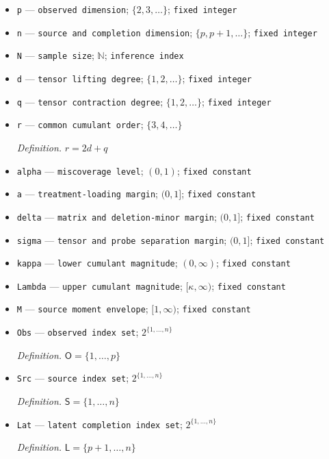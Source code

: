 \documentclass{article}
\begin{document}
\begin{itemize}
  \item \texttt{p} --- \texttt{observed dimension}; \(\{2,3,\ldots\}\); \texttt{fixed integer}
  \item \texttt{n} --- \texttt{source and completion dimension}; \(\{p,p+1,\ldots\}\); \texttt{fixed integer}
  \item \texttt{N} --- \texttt{sample size}; \(\mathbb N\); \texttt{inference index}
  \item \texttt{d} --- \texttt{tensor lifting degree}; \(\{1,2,\ldots\}\); \texttt{fixed integer}
  \item \texttt{q} --- \texttt{tensor contraction degree}; \(\{1,2,\ldots\}\); \texttt{fixed integer}
  \item \texttt{r} --- \texttt{common cumulant order}; \(\{3,4,\ldots\}\)
  \par\smallskip\noindent\emph{Definition.} \(r=2d+q\)
  \item \texttt{alpha} --- \texttt{miscoverage level}; \((0,1)\); \texttt{fixed constant}
  \item \texttt{a} --- \texttt{treatment-\allowbreak{}loading margin}; \((0,1]\); \texttt{fixed constant}
  \item \texttt{delta} --- \texttt{matrix and deletion-\allowbreak{}minor margin}; \((0,1]\); \texttt{fixed constant}
  \item \texttt{sigma} --- \texttt{tensor and probe separation margin}; \((0,1]\); \texttt{fixed constant}
  \item \texttt{kappa} --- \texttt{lower cumulant magnitude}; \((0,\infty)\); \texttt{fixed constant}
  \item \texttt{Lambda} --- \texttt{upper cumulant magnitude}; \([\kappa,\infty)\); \texttt{fixed constant}
  \item \texttt{M} --- \texttt{source moment envelope}; \([1,\infty)\); \texttt{fixed constant}
  \item \texttt{Obs} --- \texttt{observed index set}; \(2^{\{1,\ldots,n\}}\)
  \par\smallskip\noindent\emph{Definition.} \(\mathsf O=\{1,\ldots,p\}\)
  \item \texttt{Src} --- \texttt{source index set}; \(2^{\{1,\ldots,n\}}\)
  \par\smallskip\noindent\emph{Definition.} \(\mathsf S=\{1,\ldots,n\}\)
  \item \texttt{Lat} --- \texttt{latent completion index set}; \(2^{\{1,\ldots,n\}}\)
  \par\smallskip\noindent\emph{Definition.} \(\mathsf L=\{p+1,\ldots,n\}\)

\end{itemize}
\end{document}
